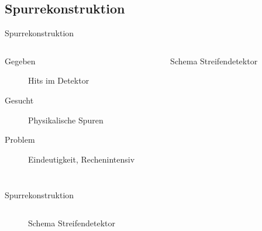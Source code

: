 \subsection[]{Spurrekonstruktion}

\begin{frame}{Spurrekonstruktion}
	\begin{columns}[T]
			\begin{description}
			  \item[Gegeben] Hits im Detektor
			  \item[Gesucht] Physikalische Spuren
			  \item[Problem] Eindeutigkeit, Rechenintensiv
			\end{description}
			
	    	\begin{figure}[htbp]
			  \centering
			   
			  \caption{Schema Streifendetektor}
			\end{figure}
    \end{columns}
\end{frame}

\begin{frame}{Spurrekonstruktion}
	\begin{columns}[T]

	    	\begin{figure}[htbp]
			  \centering
			   
			  \caption{Schema Streifendetektor}
			\end{figure}
    \end{columns}
\end{frame}
